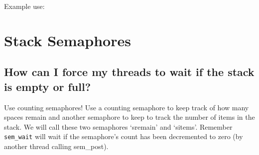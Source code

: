 Example use:

\begin{Shaded}
\begin{Highlighting}[]
 
     \NormalTok{);}
    \NormalTok{);}
    \NormalTok{);}
\NormalTok{\}}
\end{Highlighting}
\end{Shaded}

\section{Stack Semaphores}\label{stack-semaphores}

\subsection{How can I force my threads to wait if the stack is empty or
full?}\label{how-can-i-force-my-threads-to-wait-if-the-stack-is-empty-or-full}

Use counting semaphores! Use a counting semaphore to keep track of how
many spaces remain and another semaphore to keep to track the number of
items in the stack. We will call these two semaphores `sremain' and
`sitems'. Remember \texttt{sem\_wait} will wait if the semaphore's count
has been decremented to zero (by another thread calling sem\_post).

\begin{Shaded}
\begin{Highlighting}[]

 
  \NormalTok{, }\NormalTok{);}
  \NormalTok{, }\NormalTok{);}
\NormalTok{\}}


 

  
\end{Highlighting}
\end{Shaded}

